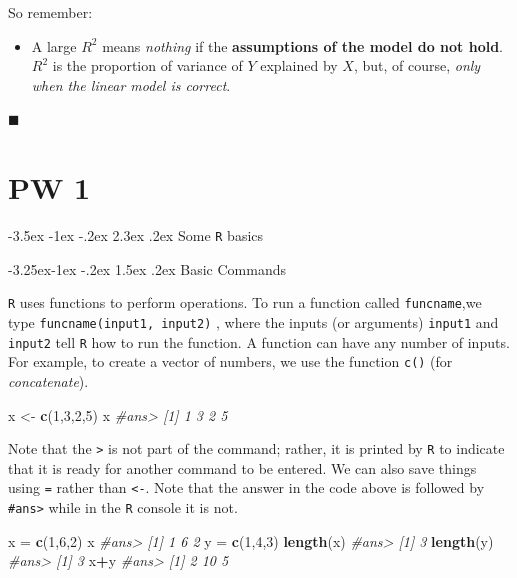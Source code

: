 \documentclass[]{book}
\makeatletter
\newenvironment{Shaded}{\begin{snugshade}}{\end{snugshade}}
\newcommand{\KeywordTok}[1]{\textcolor[rgb]{0.13,0.29,0.53}{\textbf{#1}}}
\newcommand{\DecValTok}[1]{\textcolor[rgb]{0.00,0.00,0.81}{#1}}
\newcommand{\StringTok}[1]{\textcolor[rgb]{0.31,0.60,0.02}{#1}}
\newcommand{\CommentTok}[1]{\textcolor[rgb]{0.56,0.35,0.01}{\textit{#1}}}
\newcommand{\OperatorTok}[1]{\textcolor[rgb]{0.81,0.36,0.00}{\textbf{#1}}}
\newcommand{\NormalTok}[1]{#1}
\newenvironment{rmdblock}[1]
  {\begin{shaded*}
  \begin{itemize}
  \renewcommand{\labelitemi}{
    \raisebox{-.7\height}[0pt][0pt]{
      {\setkeys{Gin}{width=2em,keepaspectratio}\texttt{[image: img/icons/\#1]}}
    }
  }
  \item
  }
  {
  \end{itemize}
  \end{shaded*}
  }
\newenvironment{rmdinsight}
  {\begin{rmdblock}{insight}}
  {\end{rmdblock}}
\renewcommand\section{\@startsection {section}{1}{\z@}%
                                   {-3.5ex \@plus -1ex \@minus -.2ex}%
                                   {2.3ex \@plus.2ex}%
                                   {\normalfont\Large\bfseries\color{ForestGreen}}}
\renewcommand\subsection{\@startsection{subsection}{2}{\z@}%
                                     {-3.25ex\@plus -1ex \@minus -.2ex}%
                                     {1.5ex \@plus .2ex}%
                                     {\normalfont\large\bfseries\color{Violet}}}
\theoremstyle{definition}
\theoremstyle{definition}
\theoremstyle{definition}
\theoremstyle{remark}
\makeatother
\begin{document}
So remember:

\begin{rmdinsight}
A large \(R^2\) means \emph{nothing} if the \textbf{assumptions of the
model do not hold}. \(R^2\) is the proportion of variance of \(Y\)
explained by \(X\), but, of course, \emph{only when the linear model is
correct}.
\end{rmdinsight}

◼

\chapter*{PW 1}\label{pw-1}

\section{\texorpdfstring{Some \texttt{R}
basics}{Some R basics}}\label{some-r-basics}

\subsection{Basic Commands}\label{basic-commands}

\texttt{R} uses functions to perform operations. To run a function
called \texttt{funcname},we type \texttt{funcname(input1,\ input2)} ,
where the inputs (or arguments) \texttt{input1} and \texttt{input2} tell
\texttt{R} how to run the function. A function can have any number of
inputs. For example, to create a vector of numbers, we use the function
\texttt{c()} (for \emph{concatenate}).

\begin{Shaded}
\begin{Highlighting}[]
\NormalTok{x <-}\StringTok{ }\KeywordTok{c}\NormalTok{(}\DecValTok{1}\NormalTok{,}\DecValTok{3}\NormalTok{,}\DecValTok{2}\NormalTok{,}\DecValTok{5}\NormalTok{)}
\NormalTok{x}
\CommentTok{#ans> [1] 1 3 2 5}
\end{Highlighting}
\end{Shaded}

Note that the \texttt{\textgreater{}} is not part of the command;
rather, it is printed by \texttt{R} to indicate that it is ready for
another command to be entered. We can also save things using \texttt{=}
rather than \texttt{\textless{}-}. Note that the answer in the code
above is followed by \texttt{\#ans\textgreater{}} while in the
\texttt{R} console it is not.

\begin{Shaded}
\begin{Highlighting}[]
\NormalTok{x =}\StringTok{ }\KeywordTok{c}\NormalTok{(}\DecValTok{1}\NormalTok{,}\DecValTok{6}\NormalTok{,}\DecValTok{2}\NormalTok{)}
\NormalTok{x}
\CommentTok{#ans> [1] 1 6 2}
\NormalTok{y =}\StringTok{ }\KeywordTok{c}\NormalTok{(}\DecValTok{1}\NormalTok{,}\DecValTok{4}\NormalTok{,}\DecValTok{3}\NormalTok{)}
\KeywordTok{length}\NormalTok{(x)}
\CommentTok{#ans> [1] 3}
\KeywordTok{length}\NormalTok{(y)}
\CommentTok{#ans> [1] 3}
\NormalTok{x}\OperatorTok{+}\NormalTok{y}
\CommentTok{#ans> [1]  2 10  5}
\end{Highlighting}
\end{Shaded}
\end{document}
